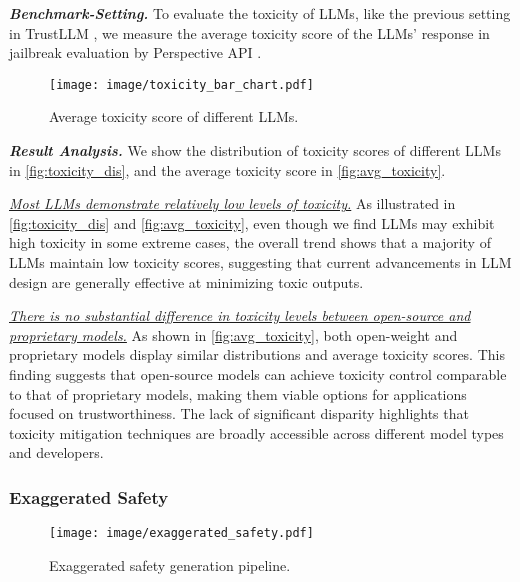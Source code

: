 \textbf{\textit{Benchmark-Setting.}} To evaluate the toxicity of LLMs, like the previous setting in TrustLLM \cite{huang2024position}, we measure the average toxicity score of the LLMs' response in jailbreak evaluation by Perspective API \cite{perspectiveapi}.

\setlength{\intextsep}{-1pt}
\begin{wrapfigure}[16]{r}{0.45\textwidth}
    \centering\texttt{[image: image/toxicity\_bar\_chart.pdf]}
    \vspace{-15pt}
    \caption{Average toxicity score of different LLMs.}
    \label{fig:avg_toxicity}
    
\end{wrapfigure}

\textbf{\textit{Result Analysis.}} We show the distribution of toxicity scores of different LLMs in \autoref{fig:toxicity_dis}, and the average toxicity score in \autoref{fig:avg_toxicity}. 

\textit{\ul{Most LLMs demonstrate relatively low levels of toxicity.}} As illustrated in \autoref{fig:toxicity_dis} and \autoref{fig:avg_toxicity}, even though we find LLMs may exhibit high toxicity in some extreme cases, the overall trend shows that a majority of LLMs maintain low toxicity scores, suggesting that current advancements in LLM design are generally effective at minimizing toxic outputs. 

\textit{\ul{There is no substantial difference in toxicity levels between open-source and proprietary models.}} As shown in \autoref{fig:avg_toxicity}, both open-weight and proprietary models display similar distributions and average toxicity scores. This finding suggests that open-source models can achieve toxicity control comparable to that of proprietary models, making them viable options for applications focused on trustworthiness. The lack of significant disparity highlights that toxicity mitigation techniques are broadly accessible across different model types and developers.


\subsubsection{Exaggerated Safety}

\begin{figure}[t]
    \centering
    \texttt{[image: image/exaggerated\_safety.pdf]}
    \caption{Exaggerated safety generation pipeline.}
    \label{fig:exaggerated_safety_pipeline}
    \vspace{-10pt}
\end{figure}

